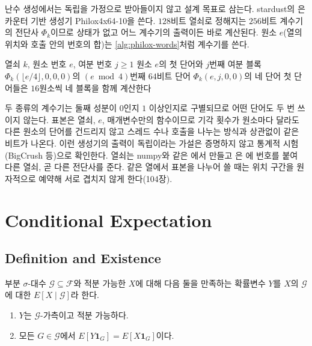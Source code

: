 난수 생성에서는 독립을 가정으로 받아들이지 않고 설계 목표로 삼는다. stardust의 은 카운터 기반 생성기 Philox4x64-10\cite{salmon2011random123}을 쓴다. $128$비트 열쇠로 정해지는 $256$비트 계수기의 전단사 $\Phi_k$이므로 상태가 없고 어느 계수기의 출력이든 바로 계산된다. 원소 $e$(열의 위치와 호출 안의 번호의 합)는 \cref{alg:philox-words}처럼 계수기를 쓴다.

\begin{algorithm}[htbp]
\begin{algorithmic}[1]
\Require 열쇠 $k$, 원소 번호 $e$, 여분 번호 $j\ge1$
\Ensure 원소 $e$의 첫 단어와 $j$번째 여분 블록
 
  \State \Return $\Phi_k(\lfloor e/4\rfloor,0,0,0)$의 $(e\bmod4)$번째 $64$비트 단어
\EndFunction
{} 
  \State \Return $\Phi_k(e,j,0,0)$의 네 단어
\EndFunction
\State 첫 단어들은 $16$원소씩 네 블록을 함께 계산한다 
\end{algorithmic}
\caption{원소별 난수 단어 (stardust , 의 )}
\label{alg:philox-words}
\end{algorithm}

두 종류의 계수기는 둘째 성분이 $0$인지 $1$ 이상인지로 구별되므로 어떤 단어도 두 번 쓰이지 않는다. 표본은 열쇠, $e$, 매개변수만의 함수이므로 기각 횟수가 원소마다 달라도 다른 원소의 단어를 건드리지 않고 스레드 수나 호출을 나누는 방식과 상관없이 같은 비트가 나온다. 이런 생성기의 출력이 독립이라는 가설은 증명하지 않고 통계적 시험(BigCrush 등)으로 확인한다. 열쇠는 numpy와 같은 에서 만들고 은 에 번호를 붙여 다른 열쇠, 곧 다른 전단사를 준다. 같은 열에서 표본을 나누어 쓸 때는 위치 구간을 원자적으로 예약해 서로 겹치지 않게 한다(104장).

\section{Conditional Expectation}
\label{sec:conditional-expectation}

\subsection{Definition and Existence}

부분 $\sigma$-대수 $\mathcal G\subseteq\mathcal F$와 적분 가능한 $X$에 대해 다음 둘을 만족하는 확률변수 $Y$를 $X$의 $\mathcal G$에 대한  $E[X\mid\mathcal G]$라 한다.
\begin{enumerate}
\item $Y$는 $\mathcal G$-가측이고 적분 가능하다.
\item 모든 $G\in\mathcal G$에서 $E[Y\mathbf 1_G]=E[X\mathbf 1_G]$이다.
\end{enumerate}

